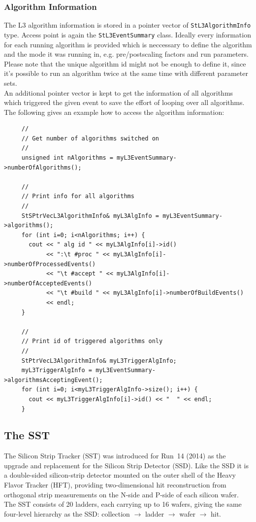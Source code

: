 \documentclass[twoside]{article}
\begin{document}
\subsubsection{Algorithm Information}
The L3 algorithm information is stored in a pointer vector of
\texttt{StL3AlgorithmInfo} type. Access point is again the
\texttt{StL3EventSummary} class. Ideally every information for each
running algorithm is provided which is neccessary to define the
algorithm and the mode it was running in, e.g. pre/postscaling factors
and run parameters. Please note that the unique algorithm id might not
be enough to define it, since it's possible to run an algorithm twice
at the same time with different parameter sets.\\
An additional pointer vector is kept to get the information of all
algorithms which triggered the given event to save the effort of
looping over all algorithms. The following gives an example how to
access the algorithm information:
\begin{verbatim}
     //
     // Get number of algorithms switched on
     //
     unsigned int nAlgorithms = myL3EventSummary->numberOfAlgorithms(); 

     //
     // Print info for all algorithms
     //
     StSPtrVecL3AlgorithmInfo& myL3AlgInfo = myL3EventSummary->algorithms(); 
     for (int i=0; i<nAlgorithms; i++) {
       cout << " alg id " << myL3AlgInfo[i]->id()
            << ":\t #proc " << myL3AlgInfo[i]->numberOfProcessedEvents()
            << "\t #accept " << myL3AlgInfo[i]->numberOfAcceptedEvents()
            << "\t #build " << myL3AlgInfo[i]->numberOfBuildEvents()
            << endl;
     }

     //
     // Print id of triggered algorithms only
     //
     StPtrVecL3AlgorithmInfo& myL3TriggerAlgInfo;
     myL3TriggerAlgInfo = myL3EventSummary->algorithmsAcceptingEvent();
     for (int i=0; i<myL3TriggerAlgInfo->size(); i++) {
       cout << myL3TriggerAlgInfo[i]->id() << "  " << endl;
     }
\end{verbatim}

\clearpage

\subsection{The SST}
The Silicon Strip Tracker (SST) was introduced for Run~14 (2014) as the upgrade
and replacement for the Silicon Strip Detector (SSD).  Like the SSD it is a
double-sided silicon-strip detector mounted on the outer shell of the Heavy
Flavor Tracker (HFT), providing two-dimensional hit reconstruction from
orthogonal strip measurements on the N-side and P-side of each silicon wafer.
The SST consists of 20 ladders, each carrying up to 16 wafers, giving the same
four-level hierarchy as the SSD: collection $\to$ ladder $\to$ wafer $\to$ hit.
\end{document}
